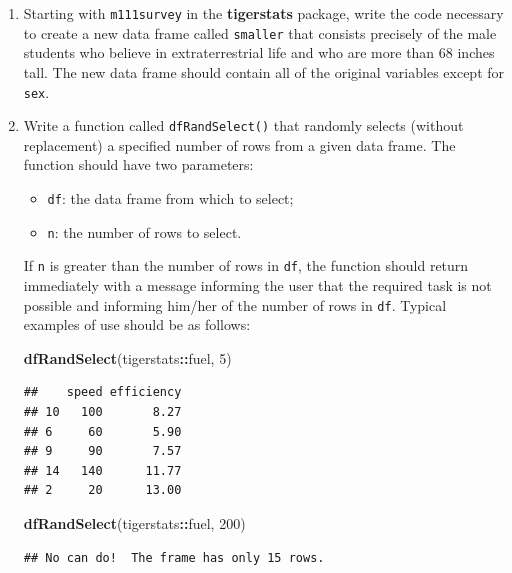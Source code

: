 \documentclass[]{book}
\makeatletter
\newenvironment{Shaded}{\begin{snugshade}}{\end{snugshade}}
\newcommand{\KeywordTok}[1]{\textcolor[rgb]{0.13,0.29,0.53}{\textbf{#1}}}
\newcommand{\DecValTok}[1]{\textcolor[rgb]{0.00,0.00,0.81}{#1}}
\newcommand{\OperatorTok}[1]{\textcolor[rgb]{0.81,0.36,0.00}{\textbf{#1}}}
\newcommand{\NormalTok}[1]{#1}
\providecommand{\tightlist}{%
  \setlength{\itemsep}{0pt}\setlength{\parskip}{0pt}}
\newenvironment{kframe}{%
\medskip{}
\setlength{\fboxsep}{.8em}
 \def\at@end@of@kframe{}%
 \ifinner\ifhmode%
  \def\at@end@of@kframe{\end{minipage}}%
  \begin{minipage}{\columnwidth}%
 \fi\fi%
 \def\FrameCommand##1{\hskip\@totalleftmargin \hskip-\fboxsep
 \colorbox{shadecolor}{##1}\hskip-\fboxsep
     \hskip-\linewidth \hskip-\@totalleftmargin \hskip\columnwidth}%
 \MakeFramed {\advance\hsize-\width
   \@totalleftmargin\z@ \linewidth\hsize
   \@setminipage}}%
 {\par\unskip\endMakeFramed%
 \at@end@of@kframe}
\renewenvironment{Shaded}{\begin{kframe}}{\end{kframe}}
\theoremstyle{definition}
\theoremstyle{definition}
\theoremstyle{definition}
\theoremstyle{remark}
\makeatother
\begin{document}
{\begin{enumerate}
\begin{verbatim}
## [1]  21  57  93 129
\end{verbatim}
\item
  Starting with \texttt{m111survey} in the \textbf{tigerstats} package,
  write the code necessary to create a new data frame called
  \texttt{smaller} that consists precisely of the male students who
  believe in extraterrestrial life and who are more than 68 inches tall.
  The new data frame should contain all of the original variables except
  for \texttt{sex}.
\item
  Write a function called \texttt{dfRandSelect()} that randomly selects
  (without replacement) a specified number of rows from a given data
  frame. The function should have two parameters:

  \begin{itemize}
  \tightlist
  \item
    \texttt{df}: the data frame from which to select;
  \item
    \texttt{n}: the number of rows to select.
  \end{itemize}

  If \texttt{n} is greater than the number of rows in \texttt{df}, the
  function should return immediately with a message informing the user
  that the required task is not possible and informing him/her of the
  number of rows in \texttt{df}. Typical examples of use should be as
  follows:

\begin{Shaded}
\begin{Highlighting}[]
\KeywordTok{dfRandSelect}\NormalTok{(tigerstats}\OperatorTok{::}\NormalTok{fuel, }\DecValTok{5}\NormalTok{)}
\end{Highlighting}
\end{Shaded}

\begin{verbatim}
##    speed efficiency
## 10   100       8.27
## 6     60       5.90
## 9     90       7.57
## 14   140      11.77
## 2     20      13.00
\end{verbatim}

\begin{Shaded}
\begin{Highlighting}[]
\KeywordTok{dfRandSelect}\NormalTok{(tigerstats}\OperatorTok{::}\NormalTok{fuel, }\DecValTok{200}\NormalTok{)}
\end{Highlighting}
\end{Shaded}

\begin{verbatim}
## No can do!  The frame has only 15 rows.
\end{verbatim}


\end{enumerate}}
\end{document}

